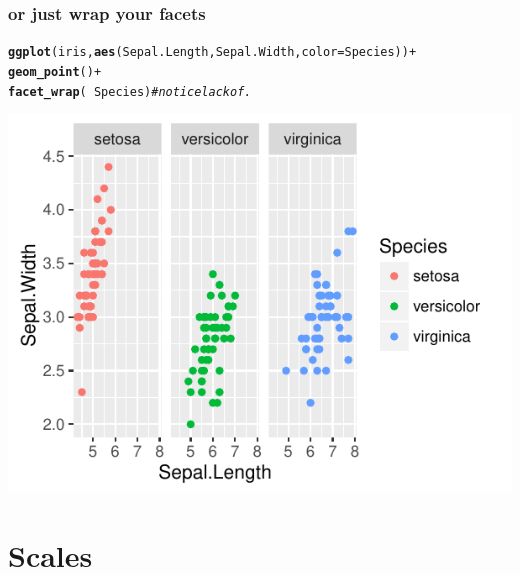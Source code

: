 \documentclass{beamer}\usepackage[]{graphicx}\usepackage[]{color}
\makeatletter
\newcommand{\hlcom}[1]{\textcolor[rgb]{0.678,0.584,0.686}{\textit{#1}}}%
\newcommand{\hlopt}[1]{\textcolor[rgb]{0,0,0}{#1}}%
\newcommand{\hlstd}[1]{\textcolor[rgb]{0.345,0.345,0.345}{#1}}%
\newcommand{\hlkwc}[1]{\textcolor[rgb]{0.333,0.667,0.333}{#1}}%
\newcommand{\hlkwd}[1]{\textcolor[rgb]{0.737,0.353,0.396}{\textbf{#1}}}%
\newenvironment{kframe}{%
 \def\at@end@of@kframe{}%
 \ifinner\ifhmode%
  \def\at@end@of@kframe{\end{minipage}}%
  \begin{minipage}{\columnwidth}%
 \fi\fi%
 \def\FrameCommand##1{\hskip\@totalleftmargin \hskip-\fboxsep
 \colorbox{shadecolor}{##1}\hskip-\fboxsep
     \hskip-\linewidth \hskip-\@totalleftmargin \hskip\columnwidth}%
 \MakeFramed {\advance\hsize-\width
   \@totalleftmargin\z@ \linewidth\hsize
   \@setminipage}}%
 {\par\unskip\endMakeFramed%
 \at@end@of@kframe}
\newenvironment{knitrout}{}{} %
\makeatother
\begin{document}
\begin{frame}[fragile]
\frametitle{or just wrap your facets}
\begin{knitrout}\footnotesize
{}\color{fgcolor}\begin{kframe}
\begin{alltt}
\hlkwd{ggplot}\hlstd{(iris,} \hlkwd{aes}\hlstd{(Sepal.Length, Sepal.Width,} \hlkwc{color} \hlstd{= Species))} \hlopt{+}
    \hlkwd{geom_point}\hlstd{()} \hlopt{+}
    \hlkwd{facet_wrap}\hlstd{(} \hlopt{~} \hlstd{Species)} \hlcom{# notice lack of .}
\end{alltt}
\end{kframe}

{\centering \includegraphics[width=.75\linewidth]{figure/facet_wrap-1} 

}



\end{knitrout}
\end{frame}


\section*{Scales}
\frame{\sectionpage}

\end{document}
